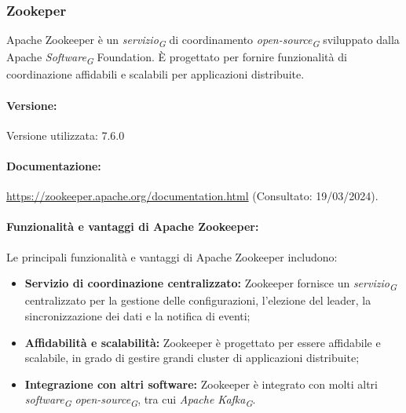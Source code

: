 \subsubsection{Zookeper}
Apache Zookeeper è un \textit{servizio}\textsubscript{\textit{G}} di coordinamento \textit{open-source}\textsubscript{\textit{G}} sviluppato dalla Apache \textit{Software}\textsubscript{\textit{G}} Foundation. È progettato per fornire funzionalità di coordinazione affidabili e scalabili per applicazioni distribuite.

\paragraph{Versione:}
Versione utilizzata: 7.6.0

\paragraph{Documentazione:}
\url{https://zookeeper.apache.org/documentation.html} (Consultato: 19/03/2024).

\paragraph{Funzionalità e vantaggi di Apache Zookeeper:}
Le principali funzionalità e vantaggi di Apache Zookeeper includono:
\begin{itemize}
    \item \textbf{Servizio di coordinazione centralizzato:} Zookeeper fornisce un \textit{servizio}\textsubscript{\textit{G}} centralizzato per la gestione delle configurazioni, l'elezione del leader, la sincronizzazione dei dati e la notifica di eventi;
    \item \textbf{Affidabilità e scalabilità:} Zookeeper è progettato per essere affidabile e scalabile, in grado di gestire grandi cluster di applicazioni distribuite;
    \item \textbf{Integrazione con altri software:} Zookeeper è integrato con molti altri \textit{software}\textsubscript{\textit{G}} \textit{open-source}\textsubscript{\textit{G}}, tra cui \textit{Apache Kafka}\textsubscript{\textit{G}}.
\end{itemize}

